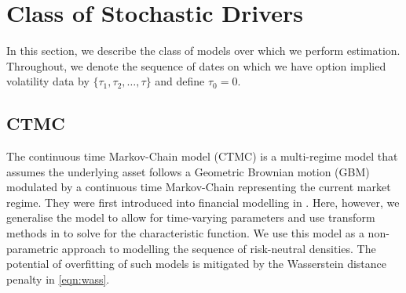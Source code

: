 \documentclass[onefignum,onetabnum]{siamonline190516}
\begin{document}
\section{Class of Stochastic Drivers}
\label{sec:models}

In this section, we describe the class of models over which we perform estimation. Throughout, we denote the sequence of dates on which we have option implied volatility data by $\{\tau_1,\tau_2,\dots,\tau\}$ and define $\tau_0=0$.

\subsection{CTMC}
\label{sec:CTMC}



The continuous time Markov-Chain model (CTMC) is a multi-regime model that assumes the underlying asset follows a Geometric Brownian motion (GBM) modulated by a continuous time Markov-Chain representing the current market regime. They were first introduced into financial modelling in \cite{buffington2002regime}. Here, however, we generalise the model to allow for time-varying parameters and use transform methods in \cite{jackson2008fourier} to solve for the characteristic function. We use this model as a non-parametric approach to modelling the sequence of risk-neutral densities.  The potential of overfitting of such models is mitigated by the Wasserstein distance penalty in \eqref{eqn:wass}.

\end{document}
